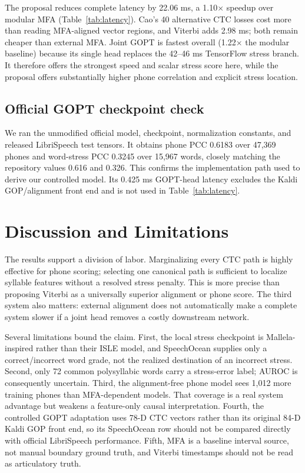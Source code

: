 \documentclass[10pt,conference]{IEEEtran}
\begin{document}
The proposal reduces complete latency by 22.06 ms, a 1.10$\times$ speedup over
modular MFA (Table~\ref{tab:latency}). Cao's 40 alternative CTC losses cost
more than reading MFA-aligned vector regions, and Viterbi adds 2.98 ms; both
remain cheaper than external MFA. Joint GOPT is fastest overall (1.22$\times$
the modular baseline) because its single head replaces the 42--46 ms
TensorFlow stress branch. It therefore offers the strongest speed and scalar
stress score here, while the proposal offers substantially higher phone
correlation and explicit stress location.

\subsection{Official GOPT checkpoint check}
\label{sec:official}

We ran the unmodified official model, checkpoint, normalization constants, and
released LibriSpeech test tensors. It obtains phone PCC 0.6183 over 47,369
phones and word-stress PCC 0.3245 over 15,967 words, closely matching the
repository values 0.616 and 0.326. This confirms the implementation path used
to derive our controlled model. Its 0.425 ms GOPT-head latency excludes the
Kaldi GOP/alignment front end and is not used in Table~\ref{tab:latency}.

\section{Discussion and Limitations}

The results support a division of labor. Marginalizing every CTC path is highly
effective for phone scoring; selecting one canonical path is sufficient to
localize syllable features without a resolved stress penalty. This is more
precise than proposing Viterbi as a universally superior alignment or phone
score. The third system also matters: external alignment does not automatically
make a complete system slower if a joint head removes a costly downstream
network.

Several limitations bound the claim. First, the local stress checkpoint is
Mallela-inspired rather than their ISLE model, and SpeechOcean supplies only a
correct/incorrect word grade, not the realized destination of an incorrect
stress. Second, only 72 common polysyllabic words carry a stress-error label;
AUROC is consequently uncertain. Third, the alignment-free phone model sees
1,012 more training phones than MFA-dependent models. That coverage is a real
system advantage but weakens a feature-only causal interpretation. Fourth, the
controlled GOPT adaptation uses 78-D CTC vectors rather than its original 84-D
Kaldi GOP front end, so its SpeechOcean row should not be compared directly
with official LibriSpeech performance. Fifth, MFA is a baseline interval source,
not manual boundary ground truth, and Viterbi timestamps should not be read as
articulatory truth.
\end{document}

